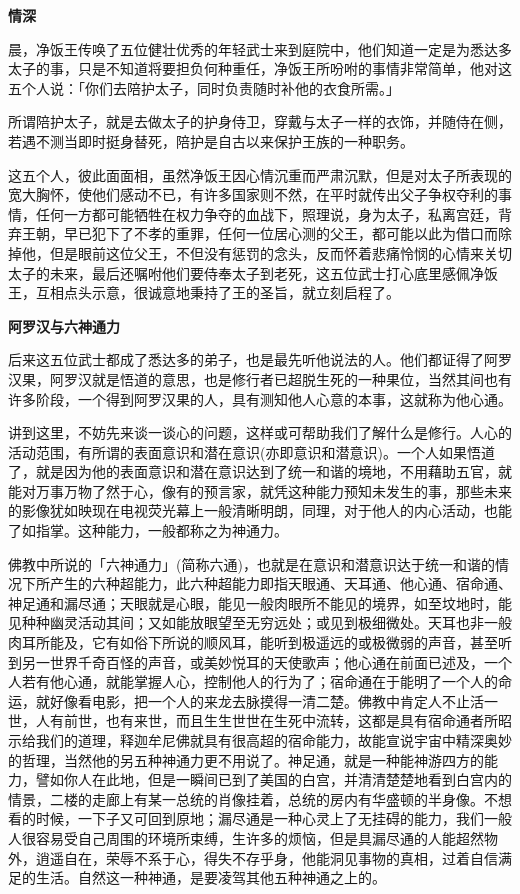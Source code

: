 \documentclass[12pt,twoside,openany]{book}
\newcommand{\mt}[1]{\textbullet \textbf{#1}}
\begin{document}
\mt{情深}

晨，净饭王传唤了五位健壮优秀的年轻武士来到庭院中，他们知道一定是为悉达多太子的事，只是不知道将要担负何种重任，净饭王所吩咐的事情非常简单，他对这五个人说：「你们去陪护太子，同时负责随时补他的衣食所需。」

所谓陪护太子，就是去做太子的护身侍卫，穿戴与太子一样的衣饰，并随侍在侧，若遇不测当即时挺身替死，陪护是自古以来保护王族的一种职务。

这五个人，彼此面面相，虽然净饭王因心情沉重而严肃沉默，但是对太子所表现的宽大胸怀，使他们感动不已，有许多国家则不然，在平时就传出父子争权夺利的事情，任何一方都可能牺牲在权力争夺的血战下，照理说，身为太子，私离宫廷，背弃王朝，早已犯下了不孝的重罪，任何一位居心测的父王，都可能以此为借口而除掉他，但是眼前这位父王，不但没有惩罚的念头，反而怀着悲痛怜悯的心情来关切太子的未来，最后还嘱咐他们要侍奉太子到老死，这五位武士打心底里感佩净饭王，互相点头示意，很诚意地秉持了王的圣旨，就立刻启程了。

\mt{阿罗汉与六神通力}

后来这五位武士都成了悉达多的弟子，也是最先听他说法的人。他们都证得了阿罗汉果，阿罗汉就是悟道的意思，也是修行者已超脱生死的一种果位，当然其间也有许多阶段，一个得到阿罗汉果的人，具有测知他人心意的本事，这就称为他心通。

讲到这里，不妨先来谈一谈心的问题，这样或可帮助我们了解什么是修行。人心的活动范围，有所谓的表面意识和潜在意识(亦即意识和潜意识)。一个人如果悟道了，就是因为他的表面意识和潜在意识达到了统一和谐的境地，不用藉助五官，就能对万事万物了然于心，像有的预言家，就凭这种能力预知未发生的事，那些未来的影像犹如映现在电视荧光幕上一般清晰明朗，同理，对于他人的内心活动，也能了如指掌。这种能力，一般都称之为神通力。

佛教中所说的「六神通力」(简称六通)，也就是在意识和潜意识达于统一和谐的情况下所产生的六种超能力，此六种超能力即指天眼通、天耳通、他心通、宿命通、神足通和漏尽通；天眼就是心眼，能见一般肉眼所不能见的境界，如至坟地时，能见种种幽灵活动其间；又如能放眼望至无穷远处；或见到极细微处。天耳也非一般肉耳所能及，它有如俗下所说的顺风耳，能听到极遥远的或极微弱的声音，甚至听到另一世界千奇百怪的声音，或美妙悦耳的天使歌声；他心通在前面已述及，一个人若有他心通，就能掌握人心，控制他人的行为了；宿命通在于能明了一个人的命运，就好像看电影，把一个人的来龙去脉摸得一清二楚。佛教中肯定人不止活一世，人有前世，也有来世，而且生生世世在生死中流转，这都是具有宿命通者所昭示给我们的道理，释迦牟尼佛就具有很高超的宿命能力，故能宣说宇宙中精深奥妙的哲理，当然他的另五种神通力更不用说了。神足通，就是一种能神游四方的能力，譬如你人在此地，但是一瞬间已到了美国的白宫，并清清楚楚地看到白宫内的情景，二楼的走廊上有某一总统的肖像挂着，总统的房内有华盛顿的半身像。不想看的时候，一下子又可回到原地；漏尽通是一种心灵上了无挂碍的能力，我们一般人很容易受自己周围的环境所束缚，生许多的烦恼，但是具漏尽通的人能超然物外，逍遥自在，荣辱不系于心，得失不存乎身，他能洞见事物的真相，过着自信满足的生活。自然这一种神通，是要凌驾其他五种神通之上的。
\end{document}
